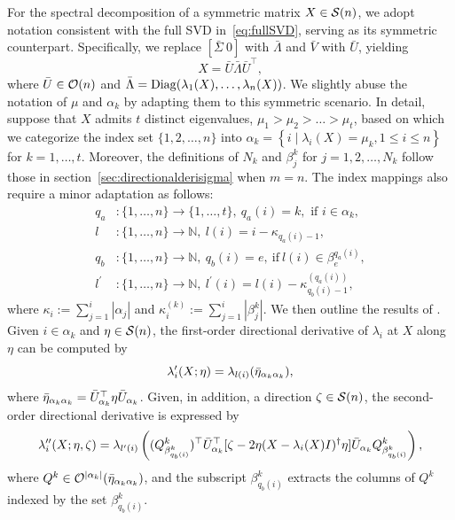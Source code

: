 For the spectral decomposition of a symmetric matrix $X\in\mathcal{S}(n)$, we adopt notation consistent with the full SVD in~\eqref{eq:fullSVD}, 
serving as its symmetric counterpart. Specifically, we replace $[\bar{\varSigma}\ 0]$ with $\bar{\Lambda}$ and $\bar{V}$ with $\bar{U}$, yielding
\[
    X=\bar{U}\bar{\Lambda}\bar{U}^\top,
\]
where $\bar{U}\in\mathcal{O}(n)$ and $\bar{\Lambda}=\operatorname{Diag}(\lambda_1(X),\ldots,\lambda_n(X))$. We slightly abuse the notation of ${\mu}$ and $\alpha_k$ by adapting them to this symmetric scenario. In detail, suppose that $X$ admits $t$ distinct eigenvalues, $\mu_1>\mu_2>\ldots>\mu_t$, based on which we categorize the index set $\{1,2,\ldots,n\}$ into $\alpha_k=\left\{i\mid \lambda_i(X)=\mu_k, 1 \leq i \leq n\right\}$ for $k=1, \ldots, t$. Moreover, the definitions of $N_k$ and $\beta_j^k$ for $j=1,2,\ldots,N_k$ follow those in section~\ref{sec:directionalderisigma} when $m=n$. The index mappings also require a minor adaptation as follows:
\begin{equation}\label{eq:adapt_indexmapping}
\begin{aligned}
q_a &:\{1, \ldots, n\} \rightarrow\{1, \ldots, t\},\ q_a(i)=k, \text { if } i \in \alpha_k, \\
l &:\{1, \ldots, n\} \rightarrow \mathbb{N},\ l(i)=i-\kappa_{q_a(i)-1}, \\
q_b &:\{1, \ldots, n\} \rightarrow \mathbb{N},\ q_b(i)=e,\ \text{if}\ l(i) \in \beta_e^{q_a(i)},\\
l^{\prime} &:\{1, \ldots, n\} \rightarrow \mathbb{N},\ l^{\prime}(i)=l(i)-\kappa_{q_b(i)-1}^{(q_a(i))},
\end{aligned}  
\end{equation}
where $\kappa_i:=\sum_{j=1}^i|\alpha_j|$ and $\kappa_i^{(k)}:=\sum_{j=1}^i|\beta_j^k|$. We then outline the results of \cite[Theorem 2.1]{zhang2013secondordersingular}. Given $i\in\alpha_k$ and $\eta\in\mathcal{S}(n)$, the first-order directional derivative of $\lambda_i$ at $X$ along $\eta$ can be computed by
\begin{equation}\label{eq:lambdaprime}
    \lambda^{\prime}_i(X;\eta) = \lambda_{l(i)} (\bar{\eta}_{\alpha_k\alpha_k}),
\end{equation}
where $\bar{\eta}_{\alpha_k\alpha_k}=\bar{U}_{\alpha_k}^\top\eta \bar{U}_{\alpha_k}$. Given, in addition, a direction $\zeta\in\mathcal{S}(n)$, the second-order directional derivative is expressed by
\begin{equation}\label{eq:lambdaprimeprime}
    \lambda^{\prime\prime}_i(X;\eta,\zeta) = \lambda_{l^\prime(i)}\left( {(Q^k_{\beta^k_{q_b(i)}})^\top \bar{U}_{\alpha_k}^\top[\zeta-2\eta(X-\lambda_i(X)I)^\dagger\eta]\bar{U}_{\alpha_k} Q^k_{\beta^k_{q_b(i)}}} \right),
\end{equation}
where $Q^k\in\mathcal{O}^{|\alpha_k|}(\bar{\eta}_{\alpha_k\alpha_k})$, and the subscript $\beta^k_{q_b(i)}$ extracts the columns of $Q^k$ indexed by the set $\beta^k_{q_b(i)}$.

